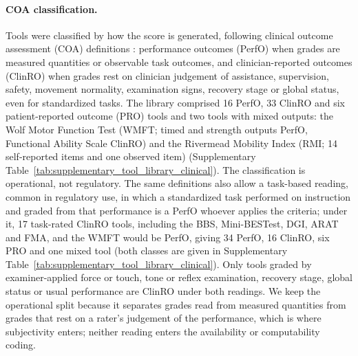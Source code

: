 \documentclass[11pt]{article}
\begin{document}
\paragraph{COA classification.} Tools were classified by how the score is generated, following clinical outcome assessment (COA) definitions \cite{FDANIH2016BESTCOA,Walton2015COAConceptualFoundation}: performance outcomes (PerfO) when grades are measured quantities or observable task outcomes, and clinician-reported outcomes (ClinRO) when grades rest on clinician judgement of assistance, supervision, safety, movement normality, examination signs, recovery stage or global status, even for standardized tasks. The library comprised 16 PerfO, 33 ClinRO and six patient-reported outcome (PRO) tools and two tools with mixed outputs: the Wolf Motor Function Test (WMFT; timed and strength outputs PerfO, Functional Ability Scale ClinRO) and the Rivermead Mobility Index (RMI; 14 self-reported items and one observed item) (Supplementary Table~\ref{tab:supplementary_tool_library_clinical}). The classification is operational, not regulatory. The same definitions also allow a task-based reading, common in regulatory use, in which a standardized task performed on instruction and graded from that performance is a PerfO whoever applies the criteria; under it, 17 task-rated ClinRO tools, including the BBS, Mini-BESTest, DGI, ARAT and FMA, and the WMFT would be PerfO, giving 34 PerfO, 16 ClinRO, six PRO and one mixed tool (both classes are given in Supplementary Table~\ref{tab:supplementary_tool_library_clinical}). Only tools graded by examiner-applied force or touch, tone or reflex examination, recovery stage, global status or usual performance are ClinRO under both readings. We keep the operational split because it separates grades read from measured quantities from grades that rest on a rater's judgement of the performance, which is where subjectivity enters; neither reading enters the availability or computability coding.
\end{document}
